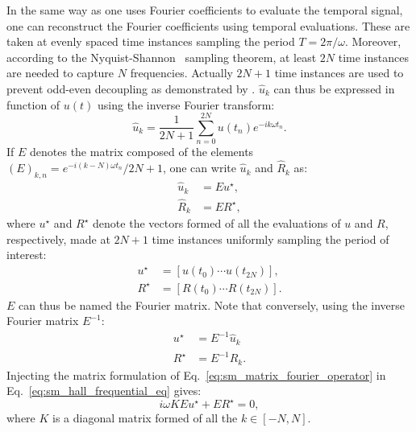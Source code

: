In the same way as one uses Fourier coefficients to
evaluate the temporal signal,
one can reconstruct the Fourier coefficients using
temporal evaluations. These are taken at evenly spaced time instances
sampling the period $T = 2 \pi / \omega$. Moreover, 
according to the Nyquist-Shannon~\cite{Shannon1949} sampling theorem, 
at least $2N$ time instances are needed to capture $N$ frequencies. Actually
$2N+1$ time instances are used to prevent odd-even decoupling as
demonstrated by \citet{Weide2005}. $\widehat{u}_k$ can thus
be expressed in function of $u(t)$ using the inverse
Fourier transform:
\begin{equation}
	\widehat{u}_k = \frac{1}{2N+1} 
	\sum_{n=0}^{2N} u(t_n) e^{-i k \omega t_n}.
\end{equation}
If $E$ denotes the matrix composed of the elements 
$(E)_{k,n} = e^{-i (k - N) \omega t_n} / 2N+1$, one can write $\widehat{u}_k$
and $\widehat{R}_k$ as:
\begin{equation}
	\begin{split}
		\widehat{u}_k &= E u^\star, \\
		\widehat{R}_k &= E R^\star,
	\end{split}
	\label{eq:sm_matrix_fourier_operator}
\end{equation}
where $u^\star$ and $R^\star$ 
denote the vectors formed of all the evaluations of $u$
and $R$, respectively,
made at $2N+1$ time instances uniformly sampling the period of interest:
\begin{equation}
	\begin{split}
		u^\star &= [u(t_0) \cdots u(t_{2N})], \\
		R^\star &= [R(t_0) \cdots R(t_{2N})].
	\end{split}
\end{equation}
$E$ can thus be named the Fourier matrix.
Note that conversely, using the inverse Fourier matrix $E^{-1}$:
\begin{equation}
	\begin{split}
		u^\star &= E^{-1} \widehat{u}_k \\
		R^\star &= E^{-1} \widehat{R}_k.
	\end{split}
	\label{eq:sm_sampling_hb_var}
\end{equation}
Injecting the matrix formulation of 
Eq.~\eqref{eq:sm_matrix_fourier_operator} in 
Eq.~\eqref{eq:sm_hall_frequential_eq}
gives:
\begin{equation}
	i \omega K E u^\star + E R^\star = 0,
\end{equation}
where $K$ is a diagonal matrix formed of all the $k \in [-N, N]$.
